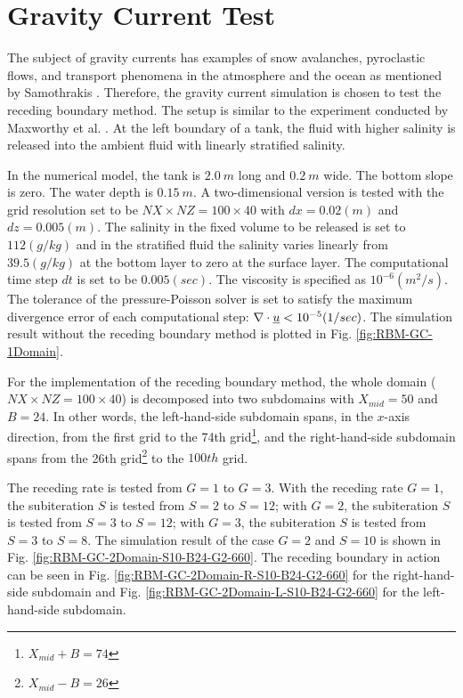 \normalsize
\section{Gravity Current Test}

The subject of gravity currents has examples of snow avalanches, pyroclastic flows, and transport phenomena in the atmosphere and the ocean as mentioned by Samothrakis \cite{Samothrakis2005}. Therefore, the gravity current simulation is chosen to test the receding boundary method. The setup is similar to the experiment conducted by Maxworthy et al. \cite{Maxworthy02}. At the left boundary of a tank, the fluid with higher salinity is released into the ambient fluid with linearly stratified salinity.



In the numerical model, the tank is $2.0 \ m$ long and $0.2 \ m$ wide. The bottom slope is zero. The water depth is $0.15 \ m$. A two-dimensional version is tested with the grid resolution set to be $NX \times NZ = 100 \times 40$ with $dx=0.02 (m)$ and $dz=0.005 (m)$.
The salinity in the fixed volume to be released is set to $112 (g/kg)$ and in the stratified fluid the salinity varies linearly from $39.5 (g/kg)$ at the bottom layer to zero at the surface layer.
The computational time step $dt$ is set to be $0.005 (sec)$. The viscosity is specified as $10^{-6} (m^2/s)$. The tolerance of the pressure-Poisson solver is set to satisfy the maximum divergence error of each computational step: $\nabla \cdot \underline u < 10^{-5} (1/sec)$. The simulation result without the receding boundary method is plotted in Fig. \ref{fig:RBM-GC-1Domain}.

For the implementation of the receding boundary method, the whole domain ($NX \times NZ = 100 \times 40$) is decomposed into two subdomains with $X_{mid} = 50$ and $B=24$. In other words, the left-hand-side subdomain spans, in the $x$-axis direction, from the first grid to the 74th grid\footnote[1]{$X_{mid} + B = 74$}, and the right-hand-side subdomain spans from the 26th grid\footnote[2]{$X_{mid} - B = 26$} to the $100th$ grid.

The receding rate is tested from $G=1$ to $G=3$. With the receding rate $G=1$, the subiteration $S$ is tested from $S=2$ to $S=12$; with $G=2$, the subiteration $S$ is tested from $S=3$ to $S=12$; with $G=3$, the subiteration $S$ is tested from $S=3$ to $S=8$.
The simulation result of the case $G=2$ and $S=10$ is shown in Fig. \ref{fig:RBM-GC-2Domain-S10-B24-G2-660}. The receding boundary in action can be seen in Fig. \ref{fig:RBM-GC-2Domain-R-S10-B24-G2-660} for the right-hand-side subdomain and Fig. \ref{fig:RBM-GC-2Domain-L-S10-B24-G2-660} for the left-hand-side subdomain.

